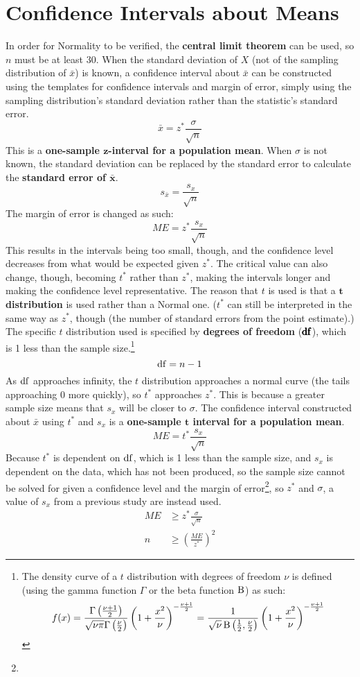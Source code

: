 \documentclass[../AP_Statistics.tex]{subfiles}
\begin{document}
		\section{Confidence Intervals about Means}
			In order for Normality to be verified, the \textbf{central limit theorem} can be used, so $n$ must be at least 30.
			When the standard deviation of $X$ (not of the sampling distribution of $\bar{x}$) is known, a confidence interval about $\bar{x}$ can be constructed using the templates for confidence intervals and margin of error, simply using the sampling distribution's standard deviation rather than the statistic's standard error.
			\[\bar{x} = z^*\frac{\sigma}{\sqrt{n}}\]
			This is a \textbf{one-sample $\pmb{z}$-interval for a population mean}.
			When $\sigma$ is not known, the standard deviation can be replaced by the standard error to calculate the \textbf{standard error of $\pmb{\bar{x}}$}.
			\[s_{\bar{x}} = \frac{s_x}{\sqrt{n}}\]
			The margin of error is changed as such:
			\[ME = z^*\frac{s_x}{\sqrt{n}}\]
			This results in the intervals being too small, though, and the confidence level decreases from what would be expected given $z^*$. The critical value can also change, though, becoming $t^*$ rather than $z^*$, making the intervals longer and making the confidence level representative. The reason that $t$ is used is that a $\pmb{t}$\textbf{ distribution} is used rather than a Normal one. ($t^*$ can still be interpreted in the same way as $z^*$, though (the number of standard errors from the point estimate).) \\
			The specific $t$ distribution used is specified by \textbf{degrees of freedom} ($\pmb{\operatorname{\mathrm{df}}}$), which  is 1 less than the sample size.\footnote{The density curve of a $t$ distribution with degrees of freedom $\nu$ is defined (using the gamma function $\Gamma$ or the beta function $\operatorname{\mathrm{B}}$) as such:\[f(x) = \frac{\Gamma\left(\frac{\nu + 1}{2}\right)}{\sqrt{\nu\pi}\Gamma\left(\frac{\nu}{2}\right)}\left(1 + \frac{x^2}{\nu}\right)^{-\frac{\nu + 1}{2}} = \frac{1}{\sqrt{\nu}\operatorname{\mathrm{B}}\left(\frac{1}{2},\frac{\nu}{2}\right)}\left(1 + \frac{x^2}{\nu}\right)^{-\frac{\nu + 1}{2}}\]} \\
			\[\operatorname{\mathrm{df}} = n - 1\]
			As $\operatorname{\mathrm{df}}$ approaches infinity, the $t$ distribution approaches a normal curve (the tails approaching 0 more quickly), so $t^*$ approaches $z^*$. This is because a greater sample size means that $s_x$ will be closer to $\sigma$.
			The confidence interval constructed about $\bar{x}$ using $t^*$ and $s_x$ is a \textbf{one-sample $\pmb{t}$ interval for a population mean}.
			\[ME = t^*\frac{s_x}{\sqrt{n}}\]
			Because $t^*$ is dependent on $\operatorname{\mathrm{df}}$, which is 1 less than the sample size, and $s_x$ is dependent on the data, which has not been produced, so the sample size cannot be solved for given a confidence level and the margin of error\footnote{}, so $z^*$ and $\sigma$, a value of $s_x$ from a previous study are instead used.
			\begin{align*}
				ME &\ge z^*\frac{\sigma}{\sqrt{n}} \\
				n &\ge \left(\frac{ME}{z^*}\right)^2
			\end{align*}
\end{document}
